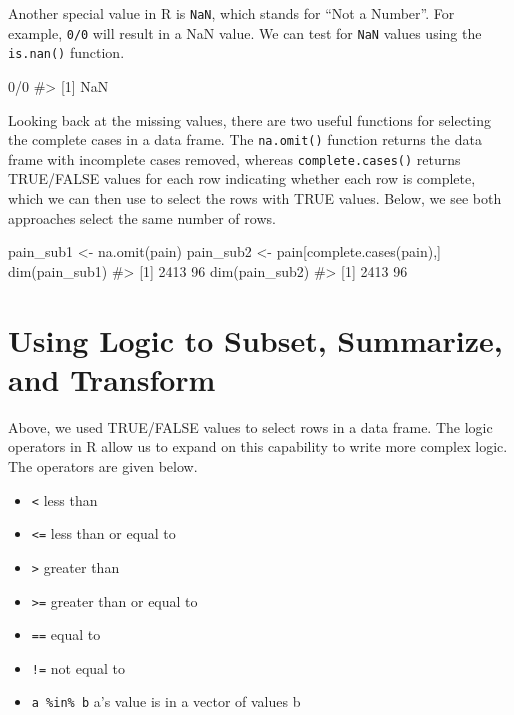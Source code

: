 \documentclass[
  letterpaper,
]{krantz}
\makeatletter
\newenvironment{Shaded}{\begin{snugshade}}{\end{snugshade}}
\newcommand{\CommentTok}[1]{\textcolor[rgb]{0.37,0.37,0.37}{#1}}
\newcommand{\DecValTok}[1]{\textcolor[rgb]{0.68,0.00,0.00}{#1}}
\newcommand{\FunctionTok}[1]{\textcolor[rgb]{0.28,0.35,0.67}{#1}}
\newcommand{\NormalTok}[1]{\textcolor[rgb]{0.00,0.23,0.31}{#1}}
\newcommand{\OtherTok}[1]{\textcolor[rgb]{0.00,0.23,0.31}{#1}}
\newcommand{\SpecialCharTok}[1]{\textcolor[rgb]{0.37,0.37,0.37}{#1}}
\providecommand{\tightlist}{%
  \setlength{\itemsep}{0pt}\setlength{\parskip}{0pt}}\usepackage{longtable,booktabs,array}
\newenvironment{kframe}{%
\medskip{}
\setlength{\fboxsep}{.8em}
 \def\at@end@of@kframe{}%
 \ifinner\ifhmode%
  \def\at@end@of@kframe{\end{minipage}}%
  \begin{minipage}{\columnwidth}%
 \fi\fi%
 \def\FrameCommand##1{\hskip\@totalleftmargin \hskip-\fboxsep
 \colorbox{shadecolor}{##1}\hskip-\fboxsep
     \hskip-\linewidth \hskip-\@totalleftmargin \hskip\columnwidth}%
 \MakeFramed {\advance\hsize-\width
   \@totalleftmargin\z@ \linewidth\hsize
   \@setminipage}}%
 {\par\unskip\endMakeFramed%
 \at@end@of@kframe}
\renewenvironment{Shaded}{\begin{kframe}}{\end{kframe}}
\makeatother
\begin{document}
Another special value in R is \texttt{NaN}, which stands for ``Not a
Number''. For example, \texttt{0/0} will result in a NaN value. We can
test for \texttt{NaN} values using the \texttt{is.nan()} function.

\begin{Shaded}
\begin{Highlighting}[]
\DecValTok{0}\SpecialCharTok{/}\DecValTok{0}
\CommentTok{\#\textgreater{} [1] NaN}
\end{Highlighting}
\end{Shaded}

Looking back at the missing values, there are two useful functions for
selecting the complete cases in a data frame. The \texttt{na.omit()}
function returns the data frame with incomplete cases removed, whereas
\texttt{complete.cases()} returns TRUE/FALSE values for each row
indicating whether each row is complete, which we can then use to select
the rows with TRUE values. Below, we see both approaches select the same
number of rows.

\begin{Shaded}
\begin{Highlighting}[]
\NormalTok{pain\_sub1 }\OtherTok{\textless{}{-}} \FunctionTok{na.omit}\NormalTok{(pain)}
\NormalTok{pain\_sub2 }\OtherTok{\textless{}{-}}\NormalTok{ pain[}\FunctionTok{complete.cases}\NormalTok{(pain),]}
\FunctionTok{dim}\NormalTok{(pain\_sub1)}
\CommentTok{\#\textgreater{} [1] 2413   96}
\FunctionTok{dim}\NormalTok{(pain\_sub2)}
\CommentTok{\#\textgreater{} [1] 2413   96}
\end{Highlighting}
\end{Shaded}

\hypertarget{using-logic-to-subset-summarize-and-transform}{%
\section{Using Logic to Subset, Summarize, and
Transform}\label{using-logic-to-subset-summarize-and-transform}}

Above, we used TRUE/FALSE values to select rows in a data frame. The
logic operators in R allow us to expand on this capability to write more
complex logic. The operators are given below.

\begin{itemize}
\tightlist
\item
  \texttt{\textless{}} less than
\item
  \texttt{\textless{}=} less than or equal to
\item
  \texttt{\textgreater{}} greater than
\item
  \texttt{\textgreater{}=} greater than or equal to
\item
  \texttt{==} equal to
\item
  \texttt{!=} not equal to
\item
  \texttt{a\ \%in\%\ b} a's value is in a vector of values b
\end{itemize}
\end{document}
